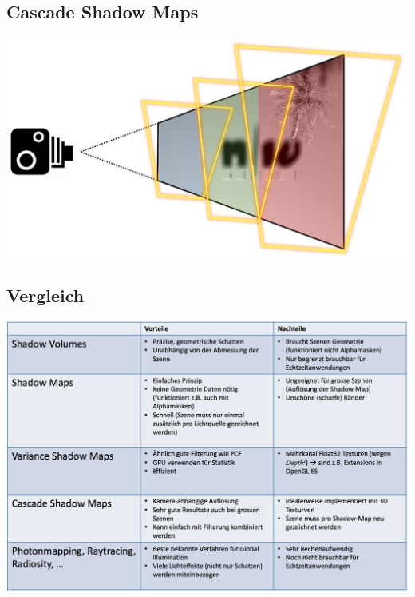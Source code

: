 \documentclass[10pt]{article}
\begin{document}
\subsection{Cascade Shadow Maps}
\begin{center}
	\includegraphics[scale=0.2]{cascade_shadow_maps.png}
\end{center}
\subsection{Vergleich}
\begin{center}
	\includegraphics[scale=0.4]{shadow_rendering.png}
\end{center}
\end{document}
